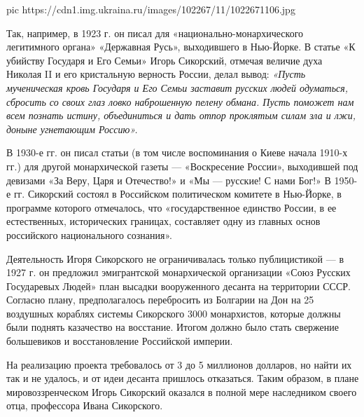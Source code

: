 \ifcmt
pic https://cdn1.img.ukraina.ru/images/102267/11/1022671106.jpg
\fi

Так, например, в 1923 г. он писал для «национально-монархического легитимного
органа» «Державная Русь», выходившего в Нью-Йорке. В статье «К убийству
Государя и Его Семьи» Игорь Сикорский, отмечая величие духа Николая II и его
кристальную верность России, делал вывод: \emph{«Пусть мученическая кровь Государя и
Его Семьи заставит русских людей одуматься, сбросить со своих глаз ловко
наброшенную пелену обмана. Пусть поможет нам всем познать истину, объединиться
и дать отпор проклятым силам зла и лжи, доныне угнетающим Россию».}

В 1930-е гг. он писал статьи (в том числе воспоминания о Киеве начала 1910-х
гг.) для другой монархической газеты — «Воскресение России», выходившей под
девизами «За Веру, Царя и Отечество!» и «Мы — русские! С нами Бог!» В 1950-е
гг. Сикорский состоял в Российском политическом комитете в Нью-Йорке, в
программе которого отмечалось, что «государственное единство России, в ее
естественных, исторических границах, составляет одну из главных основ
российского национального сознания».

Деятельность Игоря Сикорского не ограничивалась только публицистикой — в 1927
г. он предложил эмигрантской монархической организации «Союз Русских
Государевых Людей» план высадки вооруженного десанта на территории СССР.
Согласно плану, предполагалось перебросить из Болгарии на Дон на 25 воздушных
кораблях системы Сикорского 3000 монархистов, которые должны были поднять
казачество на восстание. Итогом должно было стать свержение большевиков и
восстановление Российской империи.

На реализацию проекта требовалось от 3 до 5 миллионов долларов, но найти их так
и не удалось, и от идеи десанта пришлось отказаться. Таким образом, в плане
мировоззренческом Игорь Сикорский оказался в полной мере наследником своего
отца, профессора Ивана Сикорского.

